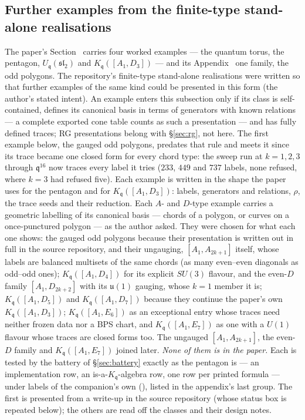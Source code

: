 \documentclass[11pt]{amsart}
\makeatletter
\newcommand\fq{\mathfrak{q}}
\newcommand\fsl{\mathfrak{sl}}
\theoremstyle{remark}
\newcommand{\pref}[1]{\@ifundefined{r@P-#1}{\textup{[\texttt{\detokenize{#1}}]}}{\ref{P-#1}}}
\makeatother
\begin{document}
\subsection{Further examples from the finite-type stand-alone realisations}\label{sec:extra-examples}
The paper's Section~\pref{sec:kq} carries four worked examples --- the
quantum torus, the pentagon, $U_\fq(\fsl_2)$ and $K_\fq([A_1,D_3])$ ---
and its Appendix~\pref{app:finite} one family, the odd polygons.  The
repository's finite-type stand-alone realisations were written so that
further examples of the same kind could be presented in this form (the
author's stated intent).  An
example enters this subsection only if its class is self-contained, defines
its canonical basis in terms of generators with known relations --- a
complete exported cone table counts as such a presentation --- and has
fully defined traces; RG presentations belong with
\S\ref{sec:rg}, not here.  The first example below, the gauged odd
polygons, predates that rule and meets it since its trace became one closed
form for every chord type: the sweep run at $k=1,2,3$
through $\fq^{16}$ now traces every label it tries ($233$, $449$ and $737$
labels, none refused, where $k=3$ had refused five).  Each example is
written in the shape the paper uses for the pentagon and for
$K_\fq([A_1,D_3])$: labels, generators and relations, $\rho$, the trace
seeds and their reduction.  Each $A$- and $D$-type example carries a
geometric labelling of its canonical basis --- chords of a polygon, or
curves on a once-punctured polygon --- as the author asked.  They were chosen for what each one shows: the gauged odd polygons
because their presentation is written out in full in the source repository,
and their ungauging, $[A_1,A_{2k+1}]$ itself, whose labels are balanced
multisets of the same chords (as many even--even diagonals as odd--odd ones); $K_\fq([A_1,D_4])$ for its explicit $SU(3)$ flavour, and the
even-$D$ family $[A_1,D_{2k+2}]$ with its $\mathfrak u(1)$ gauging, whose
$k=1$ member it is; $K_\fq([A_1,D_5])$ and $K_\fq([A_1,D_7])$ because they
continue the paper's own $K_\fq([A_1,D_3])$; $K_\fq([A_1,E_6])$ as an
exceptional entry whose traces need neither frozen data nor a BPS chart, and
$K_\fq([A_1,E_7])$ as one with a $U(1)$ flavour whose traces are closed forms
too.  The ungauged $[A_1,A_{2k+1}]$, the even-$D$ family and
$K_\fq([A_1,E_7])$ joined later.  \emph{None of them is in
the paper.}  Each is tested by the battery of \S\ref{sec:battery} exactly
as the pentagon is --- an implementation row, an is-a-$K_\fq$-algebra row,
one row per printed formula --- under labels of the companion's own
(), listed in the appendix's last group.  The first is
presented from a write-up in the source repository (whose status box is
repeated below); the others are read off the classes and their design
notes.
\end{document}
